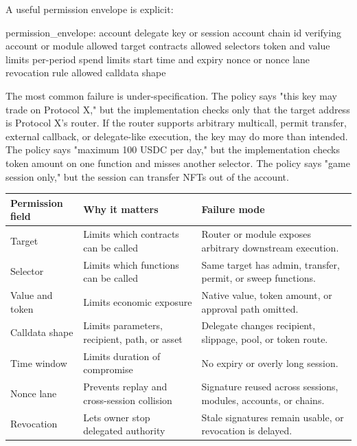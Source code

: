 A useful permission envelope is explicit:

\begin{codeblock}
permission_envelope:
    account
    delegate key or session account
    chain id
    verifying account or module
    allowed target contracts
    allowed selectors
    token and value limits
    per-period spend limits
    start time and expiry
    nonce or nonce lane
    revocation rule
    allowed calldata shape
\end{codeblock}

The most common failure is under-specification. The policy says "this key may trade on Protocol X," but the implementation checks only that the target address is Protocol X's router. If the router supports arbitrary multicall, permit transfer, external callback, or delegate-like execution, the key may do more than intended. The policy says "maximum 100 USDC per day," but the implementation checks token amount on one function and misses another selector. The policy says "game session only," but the session can transfer NFTs out of the account.

\begin{table}[htbp]
\centering
\small
\renewcommand{\arraystretch}{1.14}
\begin{tabularx}{\textwidth}{@{}>{\RaggedRight\arraybackslash}p{}>{\RaggedRight\arraybackslash}p{}X@{}}
\toprule
Permission field & Why it matters & Failure mode \\
\midrule
Target & Limits which contracts can be called & Router or module exposes arbitrary downstream execution. \\
Selector & Limits which functions can be called & Same target has admin, transfer, permit, or sweep functions. \\
Value and token & Limits economic exposure & Native value, token amount, or approval path omitted. \\
Calldata shape & Limits parameters, recipient, path, or asset & Delegate changes recipient, slippage, pool, or token route. \\
Time window & Limits duration of compromise & No expiry or overly long session. \\
Nonce lane & Prevents replay and cross-session collision & Signature reused across sessions, modules, accounts, or chains. \\
Revocation & Lets owner stop delegated authority & Stale signatures remain usable, or revocation is delayed. \\
\bottomrule
\end{tabularx}
\end{table}

